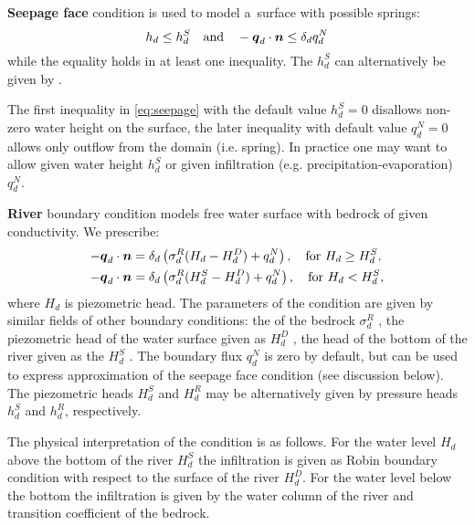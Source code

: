 {\bf Seepage face} condition is used to model a~surface with possible springs:
\begin{equation}\label{eq:seepage}
    h_d \le h_d^S\quad \text{and} \quad -\vc q_d \cdot \vc n \le \delta_d q_d^N
\end{equation}
while the equality holds in at least one inequality. The  
$h_d^S$  can alternatively be given by .

The first inequality in \eqref{eq:seepage}
with the default value $h_d^S=0$ disallows non-zero water height on the surface, the later
inequality with default value $q_d^N=0$ allows only outflow from the domain (i.e. spring).
In practice one may want to allow given water height $h_d^S$ or given infiltration (e.g. precipitation-evaporation) $q_d^N$.

{\bf River} boundary condition models free water surface with bedrock of given conductivity. 
We prescribe:
\begin{align}
  -\mathbf{\boldsymbol{q}}_d \cdot \mathbf{\boldsymbol{n}} &= \delta_d\left(\sigma_d^R ( H_d - H_d^D) + q_d^N\right), \quad \text{for } H_d \ge H_d^S,\\
  -\mathbf{\boldsymbol{q}}_d \cdot \mathbf{\boldsymbol{n}} &= \delta_d\left(\sigma_d^R ( H_d^S - H_d^D)+q_d^N\right), \quad \text{for } H_d < H_d^S,
\end{align}
where $H_d$ is piezometric head.
The parameters of the condition are given by similar fields of other boundary conditions: 
the  of the bedrock $\sigma_d^R$ , 
the piezometric head of the water surface given as   $H_d^D$ ,
the head of the bottom of the river given as the  
$H_d^S$ . The boundary flux $q_d^N$ is zero by default, but can be used to express approximation of the seepage face condition 
(see discussion below).  The piezometric heads  $H_d^S$ and $H_d^R$ may be alternatively 
given by pressure heads $h_d^S$ and $h_d^R$, respectively.

The physical interpretation of the condition is as follows. For the water level $H_d$ above the bottom of the river $H_d^S$ the infiltration is given 
as Robin boundary condition with respect to the surface of the river $H_d^D$. 
For the water level below the bottom the infiltration is given by the water column of the river and transition coefficient of the bedrock.

